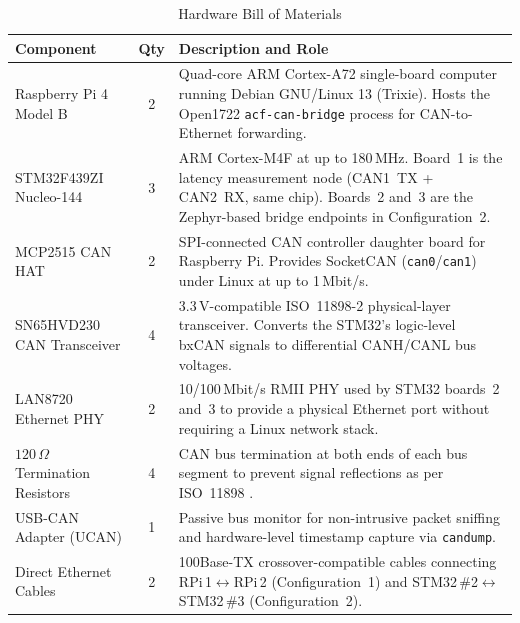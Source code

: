 \documentclass[11pt,a4paper]{article}
\begin{document}
\begin{table}[H]
    \centering
    \caption{Hardware Bill of Materials}
    \label{tab:hardware}
    \begin{tabularx}{\textwidth}{|l|c|X|}
        \hline
        \textbf{Component} & \textbf{Qty} & \textbf{Description and Role} \\
        \hline
        Raspberry Pi 4 Model B~\cite{rpi4} & 2 &
            Quad-core ARM Cortex-A72 single-board computer running
            Debian GNU/Linux 13 (Trixie).  Hosts the Open1722
            \texttt{acf-can-bridge} process for CAN-to-Ethernet forwarding. \\
        \hline
        STM32F439ZI Nucleo-144~\cite{stm32rm} & 3 &
            ARM Cortex-M4F at up to 180\,MHz.  Board~1 is the latency
            measurement node (CAN1~TX + CAN2~RX, same chip).  Boards~2
            and~3 are the Zephyr-based bridge endpoints in
            Configuration~2. \\
        \hline
        MCP2515 CAN HAT & 2 &
            SPI-connected CAN controller daughter board for Raspberry Pi.
            Provides SocketCAN (\texttt{can0}/\texttt{can1}) under Linux
            at up to 1\,Mbit/s. \\
        \hline
        SN65HVD230 CAN Transceiver & 4 &
            3.3\,V-compatible ISO~11898-2 physical-layer transceiver.
            Converts the STM32's logic-level bxCAN signals to differential
            CANH/CANL bus voltages. \\
        \hline
        LAN8720 Ethernet PHY & 2 &
            10/100\,Mbit/s RMII PHY used by STM32 boards~2 and~3 to
            provide a physical Ethernet port without requiring a Linux
            network stack. \\
        \hline
        $120\,\Omega$ Termination Resistors & 4 &
            CAN bus termination at both ends of each bus segment to
            prevent signal reflections as per ISO~11898 \cite{iso11898}. \\
        \hline
        USB-CAN Adapter (UCAN) & 1 &
            Passive bus monitor for non-intrusive packet sniffing and
            hardware-level timestamp capture via \texttt{candump}. \\
        \hline
        Direct Ethernet Cables & 2 &
            100Base-TX crossover-compatible cables connecting
            RPi\,1$\leftrightarrow$RPi\,2 (Configuration~1) and
            STM32\,\#2$\leftrightarrow$STM32\,\#3 (Configuration~2). \\
        \hline
    \end{tabularx}
\end{table}
\end{document}
